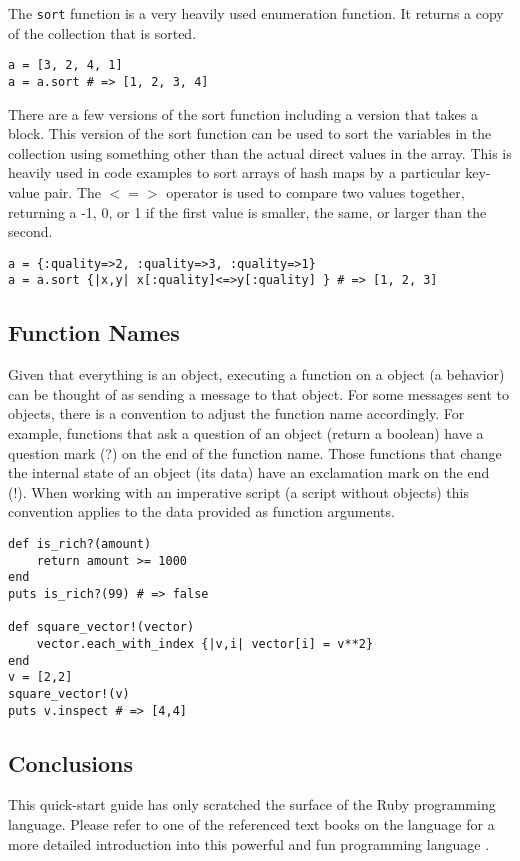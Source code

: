 The \texttt{sort} function is a very heavily used enumeration function. It returns a copy of the collection that is sorted. 

\begin{lstlisting}
a = [3, 2, 4, 1]
a = a.sort # => [1, 2, 3, 4]
\end{lstlisting}

There are a few versions of the sort function including a version that takes a block. This version of the sort function can be used to sort the variables in the collection using something other than the actual direct values in the array. This is heavily used in code examples to sort arrays of hash maps by a particular key-value pair. The \texttt{$<=>$} operator is used to compare two values together, returning a -1, 0, or 1 if the first value is smaller, the same, or larger than the second. 

\begin{lstlisting}
a = {:quality=>2, :quality=>3, :quality=>1}
a = a.sort {|x,y| x[:quality]<=>y[:quality] } # => [1, 2, 3]
\end{lstlisting}

\subsection{Function Names}
Given that everything is an object, executing a function on a object (a behavior) can be thought of as sending a message to that object. For some messages sent to objects, there is a convention to adjust the function name accordingly. For example, functions that ask a question of an object (return a boolean) have a question mark (?) on the end of the function name. Those functions that change the internal state of an object (its data) have an exclamation mark on the end (!). When working with an imperative script (a script without objects) this convention applies to the data provided as function arguments.

\begin{lstlisting}
def is_rich?(amount)
	return amount >= 1000
end
puts is_rich?(99) # => false

def square_vector!(vector)
	vector.each_with_index {|v,i| vector[i] = v**2}
end
v = [2,2]
square_vector!(v) 
puts v.inspect # => [4,4]
\end{lstlisting}

\subsection{Conclusions}
This quick-start guide has only scratched the surface of the Ruby programming language. Please refer to one of the referenced text books on the language for a more detailed introduction into this powerful and fun programming language \cite{Thomas2004, Flanagan2008}.


